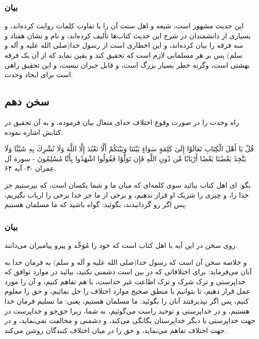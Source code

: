 \subsubsection*{بیان}

این حدیث مشهور است، شیعه و اهل سنت آن را با تفاوت کلمات روایت کرده‌اند،
و بسیاری از دانشمندان در شرح این حدیث کتاب‌ها تألیف کرده‌اند، و نام و
نشان هفتاد و سه فرقه را بیان کرده‌اند، و این اخطاری است از رسول خدا(صلی
الله علیه و آله و سلم) پس بر هر مسلمانی لازم است که تحقیق کند و یقین
نماید که از آن یک فرقه بهشتی است، وگرنه خطر بسیار بزرگ است، و قابل
جبران نیست، و این تحقیق راهی است برای ایجاد وحدت.

\subsection*{سخن دهم}

راه وحدت را در صورت وقوع اختلاف خدای متعال بیان فرموده، و به آن تحقیق
در کتابش اشاره نموده.

قُلْ يَا أَهْلَ الْكِتَابِ تَعَالَوْا إِلَىٰ كَلِمَةٍ سَوَاءٍ بَيْنَنَا وَبَيْنَكُمْ أَلَّا نَعْبُدَ إِلَّا اللَّهَ
وَلَا نُشْرِكَ بِهِ شَيْئًا وَلَا يَتَّخِذَ بَعْضُنَا بَعْضًا أَرْبَابًا مِّن دُونِ اللَّهِ فَإِن تَوَلَّوْا
فَقُولُوا اشْهَدُوا بِأَنَّا مُسْلِمُونَ - سورة آل عِمران -۳- آیه ۶۴.

بگو: ای اهل کتاب بیائید سوی کلمه‌ای که میان ما و شما یکسان است، که
نپرستیم جز خدا را، و چیزی را شریک او قرار ندهیم، و برخی از ما جز خدا
برخی را ارباب نگیریم، پس اگر رو گردانیدند، بگوئید: گواه باشید که ما
مسلمان هستیم.

\subsubsection*{بیان}

روی سخن در این آیه با اهل کتاب است که خود را مُوَحِّد و پیرو پیامبران می‌دانند.

و خلاصه سخن آن است که رسول خدا(صلی الله علیه و آله و سلم) به فرمان خدا
به آنان می‌فرماید: برای اختلافاتی که در بین است دشمنی نکنید، بیائید در
موارد توافق که خداپرستی و ترک شرک و ترک اطاعت غیر خداست، با هم تفاهم
کنیم، و آن را مورد عمل قرار دهیم، تا بتوانیم با منطق صحیح موارد اختلاف
را حل نمائیم، و حق را معلوم کنیم، پس اگر نپذیرفتند آنان را بگوئید: ما
مسلمان هستیم، یعنی: ما تسلیم فرمان خدا هستیم، و در خداپرستی و توحید
راست می‌گوئیم، نه شما، زیرا حق‌جو و خداپرست در جهت خداپرستی با دیگر
خداپرستان یگانگی می‌کند، و دشمنی و مخالفت نمی‌نماید، و در جهت اختلاف
تفاهم می‌نماید، و حق را در میان اختلاف کنندگان روشن می‌کند.

